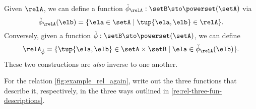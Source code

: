 \begin{remark}
\begin{enumerate}
Given $\relA$, we can define a function $\check \phi_{\relA} : \setB \sto \powerset (\setA)$ via 
\begin{equation}
\check \phi_{\relA} (\elb) = \{ \ela \in \setA \mid \tup{\ela, \elb} \in \relA \}. 
\end{equation}
Conversely, given a function $\check \phi : \setB \sto \powerset (\setA)$, we can define 
\begin{equation}
\relA_{\check \phi} = \{ \tup{\ela, \elb} \in \setA \times \setB \mid \ela \in \check \phi_{\relA}(\elb)   \}.
\end{equation}
These two constructions are \emph{also} inverse to one another. 
\end{enumerate}
\end{remark}

\begin{gradedexercise}\label{ex:Rel3Functions}
For the relation \cref{fig:example_rel_again}, 
write out the three functions that describe it, respectively, in the three ways outlined in \cref{re:rel-three-fun-descriptions}. 
\end{gradedexercise}
\begin{marginfigure}
  \centering
  \caption{}
  \label{fig:example_rel_again}
\end{marginfigure}

